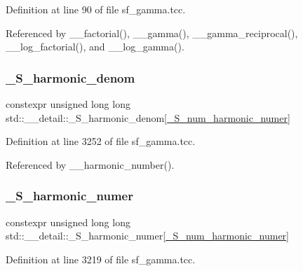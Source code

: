 Definition at line 90 of file sf\+\_\+gamma.\+tcc.



Referenced by \+\_\+\+\_\+factorial(), \+\_\+\+\_\+gamma(), \+\_\+\+\_\+gamma\+\_\+reciprocal(), \+\_\+\+\_\+log\+\_\+factorial(), and \+\_\+\+\_\+log\+\_\+gamma().

\mbox{\label{namespacestd_1_1____detail_ad2bdb66d93fa4433097b287c7899cd1e}} 
\subsubsection{\texorpdfstring{\+\_\+\+S\+\_\+harmonic\+\_\+denom}{\_S\_harmonic\_denom}}
{\footnotesize\ttfamily constexpr unsigned long long std\+::\+\_\+\+\_\+detail\+::\+\_\+\+S\+\_\+harmonic\+\_\+denom\mbox{[}\hyperlink{namespacestd_1_1____detail_a554788747841f6abbfd7572673df32ad}{\+\_\+\+S\+\_\+num\+\_\+harmonic\+\_\+numer}\mbox{]}}



Definition at line 3252 of file sf\+\_\+gamma.\+tcc.



Referenced by \+\_\+\+\_\+harmonic\+\_\+number().

\mbox{\label{namespacestd_1_1____detail_a3976bb1731d7ecfaba4601d1083d7cf6}} 
\subsubsection{\texorpdfstring{\+\_\+\+S\+\_\+harmonic\+\_\+numer}{\_S\_harmonic\_numer}}
{\footnotesize\ttfamily constexpr unsigned long long std\+::\+\_\+\+\_\+detail\+::\+\_\+\+S\+\_\+harmonic\+\_\+numer\mbox{[}\hyperlink{namespacestd_1_1____detail_a554788747841f6abbfd7572673df32ad}{\+\_\+\+S\+\_\+num\+\_\+harmonic\+\_\+numer}\mbox{]}}



Definition at line 3219 of file sf\+\_\+gamma.\+tcc.



